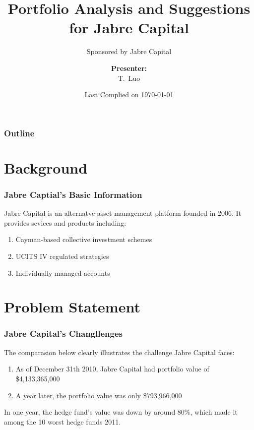 \documentclass[compress,handout,10pt]{beamer}
\title{{\color{blue} \LARGE Portfolio Analysis and Suggestions for Jabre Capital\newline} }
\subtitle{{\color{red} \large Sponsored by Jabre Capital} }
\author{ 
    {\bf{Presenter:}} \\ 
T.~Luo \\ 
    \vspace{5pt}
}
\institute{JHU AMS 2012 FALL}
\date{\mygreen Last Complied on \today}
\let\olditem\item
\renewcommand{\item}{\setlength{\itemsep}{0.5\baselineskip}\olditem}
\begin{document}
\begin{frame}[plain]
    \titlepage
\end{frame}

\begin{frame}
    \frametitle{Outline}
    \tableofcontents
\end{frame}

\section{Background}

\begin{frame}
    \frametitle{Jabre Captial's Basic Information}
    Jabre Capital is an alternatve asset management platform founded in 2006. It provides sevices and products including:
    \vspace{7pt}
             \begin{enumerate}
                 \item Cayman-based collective investment schemes
                 \item UCITS IV regulated strategies 
                 \item Individually managed accounts
		 \end{enumerate}
\end{frame}
     
\section{Problem Statement}
\begin{frame}
    \frametitle{Jabre Capital's Changllenges}
The comparasion below clearly illustrates the challenge Jabre Capital faces:
\vspace{7pt}    
\begin{enumerate}
        \item As of December 31th 2010, Jabre Capital had portfolio value of \$4,133,365,000
	\item A year later, the portfolio value was only \$793,966,000
     \end{enumerate}
\color{red}    In one year, the hedge fund's value was down by around 80\%, which made it among the 10 worst hedge funds 2011.    
\end{frame}
\end{document}
